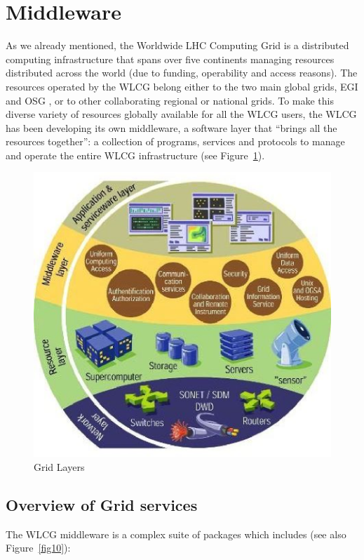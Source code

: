 \section{Middleware}

As we already mentioned, the Worldwide LHC Computing Grid is a
distributed computing infrastructure that spans over five continents
managing resources distributed across the world (due to  funding,
operability and access reasons). The resources operated by the WLCG
belong either to the two main global grids, EGI \cite{EGI} and OSG \cite{OSG}, or
to other collaborating regional or national grids. To make this
diverse variety of resources globally available for all the WLCG
users, the WLCG has been developing its own middleware, a software
layer that ``brings all the resources together'': a collection of
programs, services and protocols to manage and operate the entire
WLCG infrastructure (see Figure~\ref{fig09}).

\begin{figure}[htb] %
\centering
\includegraphics[width=13cm]{fig09.eps} %
\caption{Grid Layers}\label{fig09}
\end{figure}



\subsection{Overview of Grid services}
%
The WLCG middleware is a complex suite of packages which includes
(see also Figure~\ref{fig10}):

